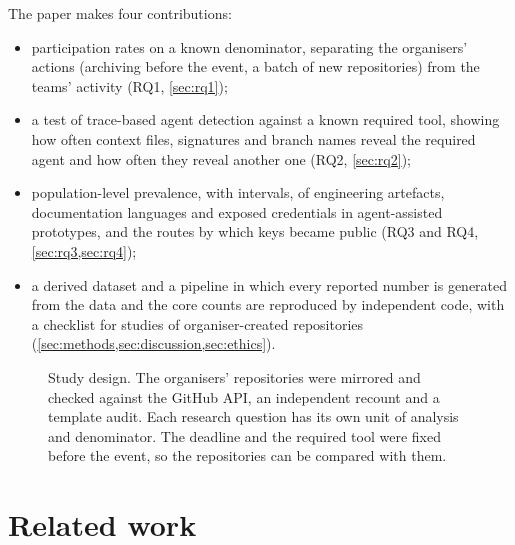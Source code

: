 \documentclass{article}
\begin{document}
\noindent The paper makes four contributions:
\begin{itemize}
  \item participation rates on a known denominator, separating the organisers' actions (archiving before the event, a batch of new repositories) from the teams' activity (RQ1, \cref{sec:rq1});
  \item a test of trace-based agent detection against a known required tool, showing how often context files, signatures and branch names reveal the required agent and how often they reveal another one (RQ2, \cref{sec:rq2});
  \item population-level prevalence, with intervals, of engineering artefacts, documentation languages and exposed credentials in agent-assisted prototypes, and the routes by which keys became public (RQ3 and RQ4, \cref{sec:rq3,sec:rq4});
  \item a derived dataset and a pipeline in which every reported number is generated from the data and the core counts are reproduced by independent code, with a checklist for studies of organiser-created repositories (\cref{sec:methods,sec:discussion,sec:ethics}).
\end{itemize}

\begin{figure}[t]
  \centering
  
  \caption{Study design. The organisers' repositories were mirrored and checked against the GitHub API, an independent recount and a template audit. Each research question has its own unit of analysis and denominator. The deadline and the required tool were fixed before the event, so the repositories can be compared with them.}
  \label{fig:overview}
\end{figure}

\section{Related work}\label{sec:related}
\end{document}
